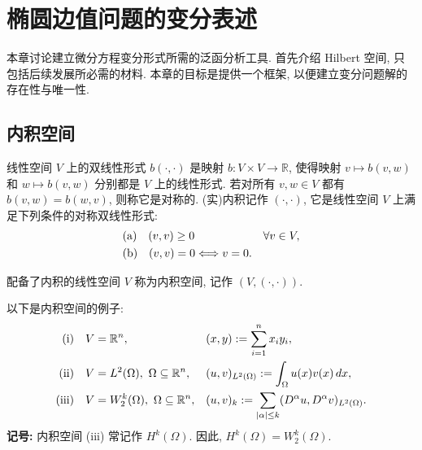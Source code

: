 \clearpage
{}
\section{椭圆边值问题的变分表述}
\label{chap:ch02-variational-formulation}

本章讨论建立微分方程变分形式所需的泛函分析工具. 首先介绍 Hilbert 空间, 只包括后续发展所必需的材料. 本章的目标是提供一个框架, 以便建立变分问题解的存在性与唯一性.

\subsection{内积空间}
\label{sec:ch02-inner-product-spaces}
\setcounter{thmcount}{0}
\setcounter{equation}{0}

\begin{Definition}
\label{def:ch02-bilinear-form-inner-product}
线性空间 $V$ 上的双线性形式 $b(\cdot,\cdot)$ 是映射 $b:V\times V\longrightarrow\mathbb R$, 使得映射 $v\mapsto b(v,w)$ 和 $w\mapsto b(v,w)$ 分别都是 $V$ 上的线性形式. 若对所有 $v,w\in V$ 都有 $b(v,w)=b(w,v)$, 则称它是对称的. (实)内积记作 $(\cdot,\cdot)$, 它是线性空间 $V$ 上满足下列条件的对称双线性形式:
\[
\MathBookFormulaID{formula-ch02-inner-product-axioms}
\begin{aligned}
&\text{(a)}\quad (v,v)\geq0 &&\forall v\in V,\\
&\text{(b)}\quad (v,v)=0\Longleftrightarrow v=0.
\end{aligned}
\]
\end{Definition}

\begin{Definition}
\label{def:ch02-inner-product-space}
配备了内积的线性空间 $V$ 称为内积空间, 记作 $(V,(\cdot,\cdot))$.
\end{Definition}

\begin{Example}
\label{ex:ch02-inner-product-spaces}
以下是内积空间的例子:
\[
\MathBookFormulaID{formula-ch02-inner-product-examples}
\begin{aligned}
\text{(i)}\quad&V=\mathbb R^n, &&(x,y):=\sum_{i=1}^n x_i y_i,\\
\text{(ii)}\quad&V=L^2(\Omega),\ \Omega\subseteq\mathbb R^n,
&&(u,v)_{L^2(\Omega)}:=\int_\Omega u(x)v(x)\,dx,\\
\text{(iii)}\quad&V=W_2^k(\Omega),\ \Omega\subseteq\mathbb R^n,
&&(u,v)_k:=\sum_{|\alpha|\leq k}(D^\alpha u,D^\alpha v)_{L^2(\Omega)}.
\end{aligned}
\]
\textbf{记号:} 内积空间 (iii) 常记作 $H^k(\Omega)$. 因此, $H^k(\Omega)=W_2^k(\Omega)$.
\end{Example}

